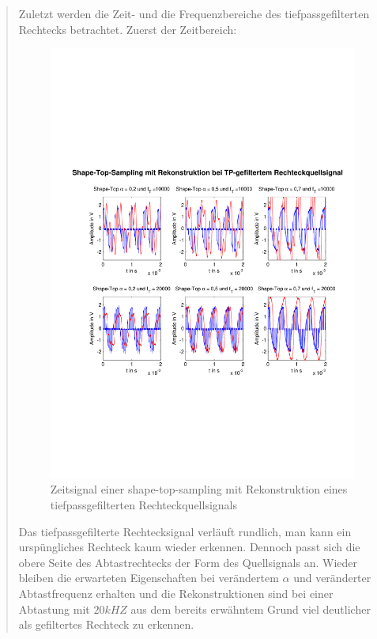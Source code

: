 \begin{quote}
    
    
    	Zuletzt werden die Zeit- und die Frequenzbereiche des tiefpassgefilterten
    	Rechtecks betrachtet. Zuerst der Zeitbereich:
    	
    	\begin{figure}[H]
    \centering
        \includegraphics[scale=0.7, trim = 0cm 0cm 0cm 0cm,
        clip]{./Bilder/shape-top-tp-recht}
            \caption{Zeitsignal einer shape-top-sampling mit Rekonstruktion
            eines tiefpassgefilterten Rechteckquellsignals}
  	    \end{figure}
    	 
    	Das tiefpassgefilterte Rechtecksignal verläuft rundlich, man kann ein
    	urspüngliches Rechteck kaum wieder erkennen. Dennoch passt sich die obere Seite des
    	Abtastrechtecks der Form des Quellsignals an. Wieder bleiben die erwarteten
    	Eigenschaften bei verändertem $\alpha$ und veränderter Abtastfrequenz
    	erhalten und die Rekonstruktionen sind bei einer Abtastung mit $20 kHZ$ aus
    	dem bereits erwähntem Grund viel deutlicher als gefiltertes Rechteck zu
    	erkennen.\\ 
    	

\end{quote}
